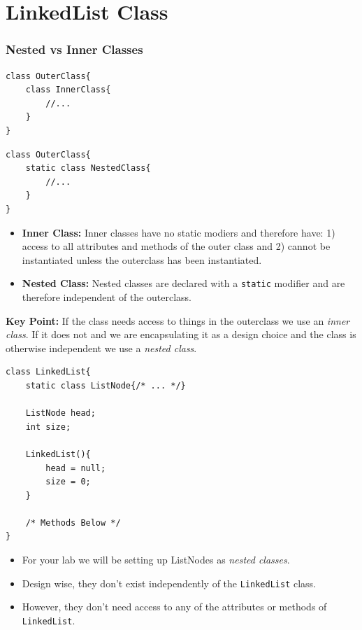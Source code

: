 \documentclass{beamer}
\begin{document}
\section{LinkedList Class}
\begin{frame}[fragile]
    \frametitle{Nested vs Inner Classes}
    \begin{minipage}{0.45\textwidth}
    \begin{lstlisting}[frame=trBL]
class OuterClass{
    class InnerClass{
        //...
    }
}
    \end{lstlisting}
    \end{minipage}
    \hfill
    \begin{minipage}{0.49\textwidth}
    \begin{lstlisting}[frame=trBL]
class OuterClass{
    static class NestedClass{
        //...
    }
}
    \end{lstlisting}
    \end{minipage}
    \begin{itemize}
        \small
        \item \textbf{Inner Class:} Inner classes have no static modiers and therefore have: 1) access to all attributes and methods of the outer class and 2) cannot be instantiated unless the outerclass has been instantiated.
        \item \textbf{Nested Class:} Nested classes are declared with a \lstinline|static| modifier and are therefore independent of the outerclass.
    \end{itemize}
    \vfill
    \textbf{Key Point:} If the class needs access to things in the outerclass we use an \textit{inner class}. If it does not and we are encapsulating
    it as a design choice and the class is otherwise independent we use a \textit{nested class}.
\end{frame}

\begin{frame}[fragile]
    \begin{lstlisting}[frame=trBL]
class LinkedList{
    static class ListNode{/* ... */}

    ListNode head;
    int size;

    LinkedList(){
        head = null;
        size = 0;
    }

    /* Methods Below */
}
    \end{lstlisting}
    \begin{itemize}
        \item For your lab we will be setting up ListNodes as \textit{nested classes}.
        \item Design wise, they don't exist independently of the \lstinline|LinkedList| class.
        \item However, they don't need access to any of the attributes or methods of \lstinline|LinkedList|.
    \end{itemize}
\end{frame}
\end{document}
